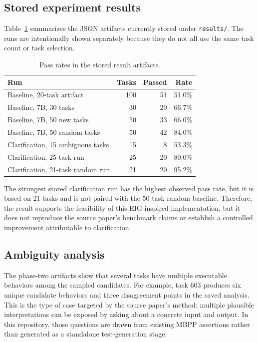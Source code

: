 \subsection{Stored experiment results}

Table~\ref{tab:results} summarizes the JSON artifacts currently stored under \texttt{results/}. The runs are intentionally shown separately because they do not all use the same task count or task selection.

\begin{table}[ht]
\centering
\caption{Pass rates in the stored result artifacts.}
\label{tab:results}
\begin{tabular}{lrrr}
\toprule
Run & Tasks & Passed & Rate \\
\midrule
Baseline, 20-task artifact & 100 & 51 & 51.0\% \\
Baseline, 7B, 30 tasks & 30 & 20 & 66.7\% \\
Baseline, 7B, 50 new tasks & 50 & 33 & 66.0\% \\
Baseline, 7B, 50 random tasks & 50 & 42 & 84.0\% \\
Clarification, 15 ambiguous tasks & 15 & 8 & 53.3\% \\
Clarification, 25-task run & 25 & 20 & 80.0\% \\
Clarification, 21-task random run & 21 & 20 & 95.2\% \\
\bottomrule
\end{tabular}
\end{table}

The strongest stored clarification run has the highest observed pass rate, but it is based on 21 tasks and is not paired with the 50-task random baseline. Therefore, the result supports the feasibility of this EIG-inspired implementation, but it does not reproduce the source paper's benchmark claims or establish a controlled improvement attributable to clarification.

\subsection{Ambiguity analysis}

The phase-two artifacts show that several tasks have multiple executable behaviors among the sampled candidates. For example, task 603 produces six unique candidate behaviors and three disagreement points in the saved analysis. This is the type of case targeted by the source paper's method: multiple plausible interpretations can be exposed by asking about a concrete input and output. In this repository, those questions are drawn from existing MBPP assertions rather than generated as a standalone test-generation stage.

